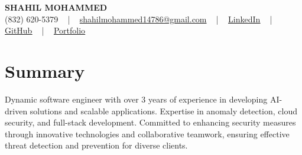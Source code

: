 \documentclass[letterpaper,10pt]{article}
\begin{document}
\begin{center}
    {\fontsize{14pt}{12pt}\selectfont \textbf{\MakeUppercase{Shahil Mohammed}}}\\ \vspace{2pt}
    \fontsize{10pt}{12pt}\selectfont (832) 620-5379 ~ | ~ \href{mailto:shahilmohammed14786@gmail.com}{shahilmohammed14786@gmail.com} ~ | ~  
    \href{https://www.linkedin.com/in/shahil-mohammed-9652931a1/}{\color{blue}\underline{LinkedIn}}  ~ | ~ 
    \href{https://github.com/freakbeast14}{\color{blue}\underline{GitHub}} ~ | ~ 
    \href{https://shahil-mohammed.netlify.app/}{\color{blue}\underline{Portfolio}}
    \vspace{-8pt}
\end{center}

\section{Summary}
\vspace{-2pt}\fontsize{8pt}{9pt}\selectfont
Dynamic software engineer with over 3 years of experience in developing AI-driven solutions and scalable applications. Expertise in anomaly detection, cloud security, and full-stack development. Committed to enhancing security measures through innovative technologies and collaborative teamwork, ensuring effective threat detection and prevention for diverse clients. 
 \vspace{-5pt}
 
\vspace{-2pt}
\end{document}
